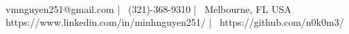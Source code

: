 \documentclass[]{awesome-cv}
\begin{document}
    
\begin{center}
	  \\
	\vspace{2mm}
	{\faEnvelope\ vmnguyen251@gmail.com} | {\faMobile\ (321)-368-9310} | {\faMapMarker\ Melbourne, FL USA} \\
	{\faLink\ https://www.linkedin.com/in/minhnguyen251/} | {\faLink\ https://github.com/n0k0m3/}
\end{center}
% 





\ 
\end{document}
